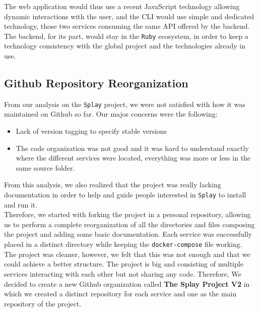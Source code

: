 \documentclass{eplmastersthesis}
\begin{document}
        The web application would thus use a recent JavaScript technology
        allowing dynamic interactions with the user, and the CLI would use
        simple and dedicated technology, those two services consuming the
        same API offered by the backend. The backend, for its part, would
        stay in the \texttt{Ruby} ecosystem, in order to keep a technology consistency
        with the global project and the technologies already in use.

      \subsection{Github Repository Reorganization}

        From our analysis on the \texttt{Splay} project, we were not satisfied with how
        it was maintained on Github so far. Our major concerns were the
        following:

        \begin{itemize}
          \item Lack of version tagging to specify stable versions
          \item The code organization was not good and it was hard to
          understand exactly where the different services were located,
          everything was more or less in the same source folder.
        \end{itemize}

        From this analysis, we also realized that the project was really
        lacking documentation in order to help and guide people interested
        in \texttt{Splay} to install and run it.\\

        Therefore, we started with forking the project in a personal repository,
        allowing us to perform a complete reorganization of all the directories
        and files composing the project and adding some basic documentation.
        Each service was successfully placed in a distinct directory while
        keeping the \texttt{docker-compose} file working.\\
        The project was cleaner, however, we felt that this was not enough
        and that we could achieve a better structure. The project is big and
        consisting of multiple services interacting with each other but
        not sharing any code. Therefore, We decided to create a new Github
        organization called \textbf{The Splay Project V2} in which we created
        a distinct repository for each service and one as the main repository
        of the project.\\
\end{document}

